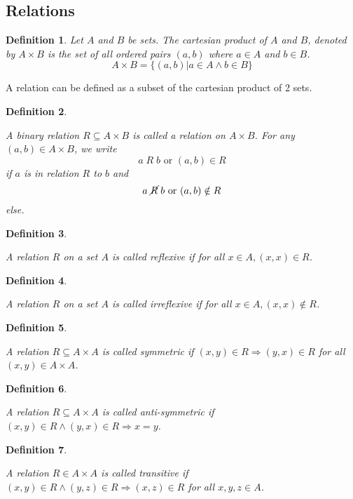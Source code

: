 \documentclass[12pt]{article}
\newtheorem{definition}{Definition} [section]
\begin{document}
\subsection{Relations}
\begin{definition} \emph{Let $A$ and $B$ be sets. The cartesian product of $A$ and $B$, denoted by $A\times B$ is the set of all ordered pairs $(a, b)$ where $a \in A$ and $b \in B$.}
\[A \times B = \{ (a, b) | a \in A \wedge b \in B \}\]
\end{definition}
A relation can be defined as a subset of the cartesian product of 2 sets.
\begin{definition}
\begin{em}
A binary relation $R \subseteq A \times B$ is called a relation on $A \times B$. For any $(a, b) \in A \times B$, we write
\[a \; R \; b \text{ or } (a, b) \in R\]
if $a$ is in relation $R$ to $b$ and
\[a \; \cancel{R} \; b \text{ or } (a, b) \notin R\]
else.
\end{em}
\end{definition}
\begin{definition}
\begin{em}
A relation $R$ on a set $A$ is called \emph{reflexive} if for all $x \in A, (x, x) \in R$.
\end{em}
\end{definition}
\begin{definition}
\begin{em}
A relation $R$ on a set $A$ is called \emph{irreflexive} if for all $x \in A, (x, x) \notin R$.
\end{em}
\end{definition}
\begin{definition}
\begin{em}
A relation $R \subseteq A \times A$ is called \emph{symmetric} if $(x, y) \in R \Rightarrow (y, x) \in R$ for all $(x, y) \in A \times A$.
\end{em}
\end{definition}
\begin{definition}
\begin{em}
A relation $R \subseteq A \times A$ is called \emph{anti-symmetric} if $(x, y) \in R \wedge (y, x) \in R \Rightarrow x = y$.
\end{em}
\end{definition}
\begin{definition}
\begin{em}
A relation $R \in A \times A$ is called \emph{transitive} if $(x, y) \in R \wedge (y, z) \in R \Rightarrow (x, z) \in R$ for all $x, y, z \in A$.
\end{em}
\end{definition}
\end{document}
